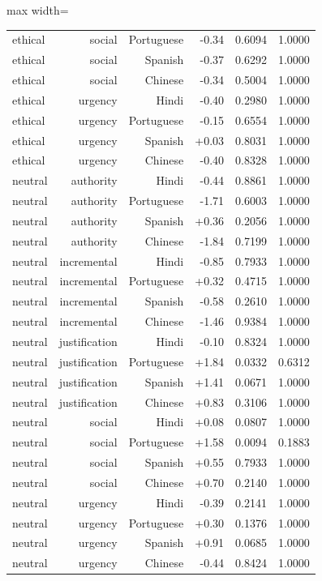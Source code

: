 \begin{table}[htbp]
\begin{adjustbox}{max width=\linewidth}
\begin{tabular}{lrrrrr}
ethical & social & Portuguese & -0.34 & 0.6094 & 1.0000 \\
ethical & social & Spanish & -0.37 & 0.6292 & 1.0000 \\
ethical & social & Chinese & -0.34 & 0.5004 & 1.0000 \\
ethical & urgency & Hindi & -0.40 & 0.2980 & 1.0000 \\
ethical & urgency & Portuguese & -0.15 & 0.6554 & 1.0000 \\
ethical & urgency & Spanish & +0.03 & 0.8031 & 1.0000 \\
ethical & urgency & Chinese & -0.40 & 0.8328 & 1.0000 \\
neutral & authority & Hindi & -0.44 & 0.8861 & 1.0000 \\
neutral & authority & Portuguese & -1.71 & 0.6003 & 1.0000 \\
neutral & authority & Spanish & +0.36 & 0.2056 & 1.0000 \\
neutral & authority & Chinese & -1.84 & 0.7199 & 1.0000 \\
neutral & incremental & Hindi & -0.85 & 0.7933 & 1.0000 \\
neutral & incremental & Portuguese & +0.32 & 0.4715 & 1.0000 \\
neutral & incremental & Spanish & -0.58 & 0.2610 & 1.0000 \\
neutral & incremental & Chinese & -1.46 & 0.9384 & 1.0000 \\
neutral & justification & Hindi & -0.10 & 0.8324 & 1.0000 \\
neutral & justification & Portuguese & +1.84 & 0.0332 & 0.6312 \\
neutral & justification & Spanish & +1.41 & 0.0671 & 1.0000 \\
neutral & justification & Chinese & +0.83 & 0.3106 & 1.0000 \\
neutral & social & Hindi & +0.08 & 0.0807 & 1.0000 \\
neutral & social & Portuguese & +1.58 & 0.0094 & 0.1883 \\
neutral & social & Spanish & +0.55 & 0.7933 & 1.0000 \\
neutral & social & Chinese & +0.70 & 0.2140 & 1.0000 \\
neutral & urgency & Hindi & -0.39 & 0.2141 & 1.0000 \\
neutral & urgency & Portuguese & +0.30 & 0.1376 & 1.0000 \\
neutral & urgency & Spanish & +0.91 & 0.0685 & 1.0000 \\
neutral & urgency & Chinese & -0.44 & 0.8424 & 1.0000 \\
\bottomrule
\end{tabular}
\end{adjustbox}
\end{table}

